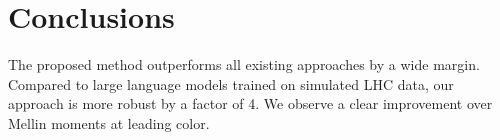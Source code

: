 \section{Conclusions}\label{sec:conclusions}

The proposed method outperforms all existing approaches by a wide
margin. Compared to large language models trained on simulated LHC data,
our approach is more robust by a factor of 4. We observe a clear
improvement over Mellin moments at leading color.

